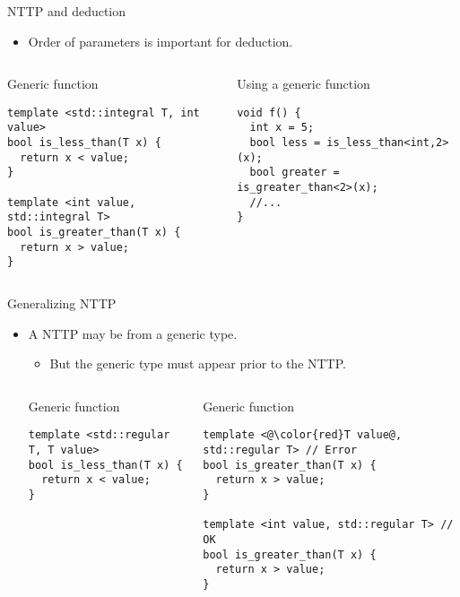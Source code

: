 \begin{frame}[t,fragile]{NTTP and deduction}
\begin{itemize}
  \item Order of parameters is important for deduction.
\end{itemize}

\begin{columns}[T]

\begin{block}{Generic function}
\begin{lstlisting}
template <std::integral T, int value>
bool is_less_than(T x) {
  return x < value;
}

template <int value, std::integral T>
bool is_greater_than(T x) {
  return x > value;
}
\end{lstlisting}
\end{block}

\begin{block}{Using a generic function}
\begin{lstlisting}
void f() {
  int x = 5;
  bool less = is_less_than<int,2>(x);
  bool greater = is_greater_than<2>(x);
  //...
}
\end{lstlisting}
\end{block}

\end{columns}

\end{frame}

\begin{frame}[t,fragile]{Generalizing NTTP}
\begin{itemize}
  \item A NTTP may be from a generic type.
    \begin{itemize}
      \item But the generic type must appear prior to the NTTP.
    \end{itemize}

\begin{columns}[T]

\begin{block}{Generic function}
\begin{lstlisting}[escapechar=@]
template <std::regular T, T value>
bool is_less_than(T x) {
  return x < value;
}
\end{lstlisting}
\end{block}

\begin{block}{Generic function}
\begin{lstlisting}[escapechar=@]
template <@\color{red}T value@, std::regular T> // Error
bool is_greater_than(T x) {
  return x > value;
}

template <int value, std::regular T> // OK
bool is_greater_than(T x) {
  return x > value;
}
\end{lstlisting}
\end{block}

\end{columns}

\end{itemize}
\end{frame}

